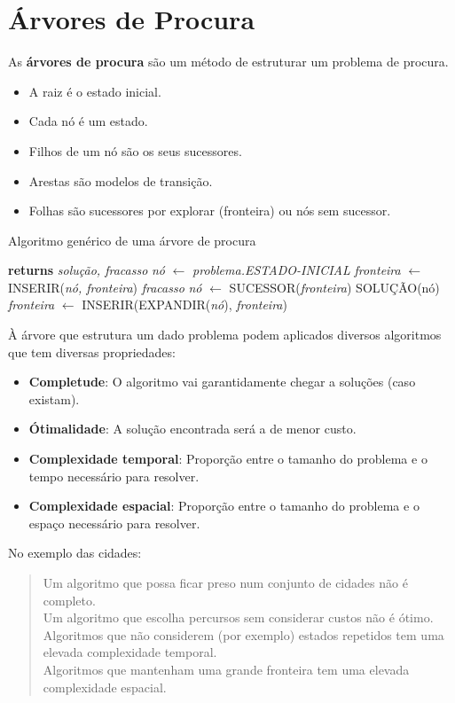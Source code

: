 \documentclass[]{report}
\begin{document}
\section{Árvores de Procura}
As \textbf{árvores de procura} são um método de estruturar um problema de procura.
\begin{itemize}
	\item A raiz é o estado inicial.
	\item Cada nó é um estado.
	\item Filhos de um nó são os seus sucessores.
	\item Arestas são modelos de transição.
	\item Folhas são sucessores por explorar (fronteira) ou nós sem sucessor.
\end{itemize}
\begin{algorithm}
	\caption{Algoritmo genérico de uma árvore de procura}
	\begin{algorithmic}
		 \textbf{returns} \textit{solução, fracasso}
		\State \textit{nó} $\gets$ \textit{problema.ESTADO-INICIAL}
		\State \textit{fronteira} $\gets$ INSERIR(\textit{nó, fronteira})
		\Loop
		\Return \textit{fracasso}
		\EndIf
		\State \textit{nó} $\gets$ SUCESSOR(\textit{fronteira})
		\Return SOLUÇÃO(nó)
		\EndIf
		\State \textit{fronteira} $\gets$ INSERIR(EXPANDIR(\textit{nó}), \textit{fronteira})
		\EndLoop
		\EndFunction
	\end{algorithmic}
\end{algorithm}
À árvore que estrutura um dado problema podem aplicados diversos algoritmos que tem diversas propriedades:
\begin{itemize}
	\item \textbf{Completude}: O algoritmo vai garantidamente chegar a soluções (caso existam).
	\item \textbf{Ótimalidade}: A solução encontrada será a de menor custo.
	\item \textbf{Complexidade temporal}: Proporção entre o tamanho do problema e o tempo necessário para resolver.
	\item \textbf{Complexidade espacial}: Proporção entre o tamanho do problema e o espaço necessário para resolver.
\end{itemize}
No exemplo das cidades:
\begin{quotation}
\noindent Um algoritmo que possa ficar preso num conjunto de cidades não é completo.\\
Um algoritmo que escolha percursos sem considerar custos não é ótimo.\\
Algoritmos que não considerem (por exemplo) estados repetidos tem uma elevada complexidade temporal.\\
Algoritmos que mantenham uma grande fronteira tem uma elevada complexidade espacial.
\end{quotation}
\end{document}
